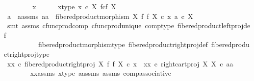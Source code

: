 \begin{isabellebody}
\ \ \isamarkupfalse%
\isanewline
\ \ \ \ \isamarkupfalse%
\ x\isanewline
\ \ \ \ \isamarkupfalse%
\ x{\isacharunderscore}{\kern0pt}type{\isacharcolon}{\kern0pt}\ {\isachardoublequoteopen}x\ {\isasymin}\isactrlsub c\ X\ \isactrlbsub f\isactrlesub {\isasymtimes}\isactrlsub c\isactrlbsub f\isactrlesub \ X{\isachardoublequoteclose}\isanewline
\ \ \ \ \isamarkupfalse%
\ \isamarkupfalse%
\ a\ \ a{\isacharunderscore}{\kern0pt}assms{\isacharcolon}{\kern0pt}\ {\isachardoublequoteopen}{\isasymlangle}a{\isacharcomma}{\kern0pt}a{\isasymrangle}\ {\isacharequal}{\kern0pt}\ fibered{\isacharunderscore}{\kern0pt}product{\isacharunderscore}{\kern0pt}morphism\ X\ f\ f\ X\ {\isasymcirc}\isactrlsub c\ x{\isachardoublequoteclose}\ {\isachardoublequoteopen}a\ {\isasymin}\isactrlsub c\ X{\isachardoublequoteclose}\isanewline
\ \ \ \ \ \ \isamarkupfalse%
\ {\isacharparenleft}{\kern0pt}smt\ assms\ cfunc{\isacharunderscore}{\kern0pt}prod{\isacharunderscore}{\kern0pt}comp\ cfunc{\isacharunderscore}{\kern0pt}prod{\isacharunderscore}{\kern0pt}unique\ comp{\isacharunderscore}{\kern0pt}type\ fibered{\isacharunderscore}{\kern0pt}product{\isacharunderscore}{\kern0pt}left{\isacharunderscore}{\kern0pt}proj{\isacharunderscore}{\kern0pt}def\isanewline
\ \ \ \ \ \ \ \ \ \ fibered{\isacharunderscore}{\kern0pt}product{\isacharunderscore}{\kern0pt}morphism{\isacharunderscore}{\kern0pt}type\ fibered{\isacharunderscore}{\kern0pt}product{\isacharunderscore}{\kern0pt}right{\isacharunderscore}{\kern0pt}proj{\isacharunderscore}{\kern0pt}def\ fibered{\isacharunderscore}{\kern0pt}product{\isacharunderscore}{\kern0pt}right{\isacharunderscore}{\kern0pt}proj{\isacharunderscore}{\kern0pt}type{\isacharparenright}{\kern0pt}\isanewline
\isanewline
\ \ \ \ \isamarkupfalse%
\ {\isachardoublequoteopen}{\isacharparenleft}{\kern0pt}xx\ {\isasymcirc}\isactrlsub c\ fibered{\isacharunderscore}{\kern0pt}product{\isacharunderscore}{\kern0pt}right{\isacharunderscore}{\kern0pt}proj\ X\ f\ f\ X{\isacharparenright}{\kern0pt}\ {\isasymcirc}\isactrlsub c\ x\ {\isacharequal}{\kern0pt}\ xx\ {\isasymcirc}\isactrlsub c\ right{\isacharunderscore}{\kern0pt}cart{\isacharunderscore}{\kern0pt}proj\ X\ X\ {\isasymcirc}\isactrlsub c\ {\isasymlangle}a{\isacharcomma}{\kern0pt}a{\isasymrangle}{\isachardoublequoteclose}\isanewline
\ \ \ \ \ \ \isamarkupfalse%
\ xx{\isacharunderscore}{\kern0pt}assms\ x{\isacharunderscore}{\kern0pt}type\ a{\isacharunderscore}{\kern0pt}assms\ assms\ comp{\isacharunderscore}{\kern0pt}associative{}\isanewline

\end{isabellebody}
